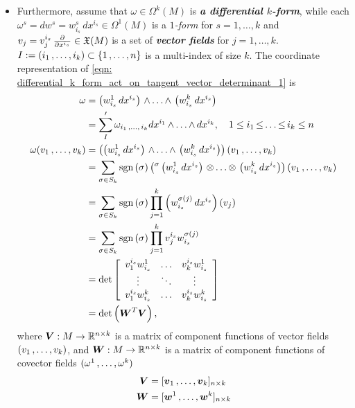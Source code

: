 \documentclass[11pt]{article}
\begin{document}
\begin{itemize}
\item Furthermore, assume that $\omega \in \Omega^k(M)$ is \emph{\textbf{a differential $k$-form}}, while each $\omega^{s} = dw^{s} = w_{i_s}^{s}\,dx^{i_s} \in \Omega^{1}(M)$ is a \emph{$1$-form} for $s=1,\ldots,k$ and $v_j = v_j^{i_s}\, \frac{\partial }{ \partial x^{i_s}} \in {\mathfrak X}(M)$ is a set of \emph{\textbf{vector fields}} for $j = 1,\ldots, k$. $I := (i_1 \,{,}\ldots{,}\, i_k) \subset \left\{1 \,{,}\ldots{,}\, n\right\}$ is a multi-index of size $k$. The coordinate representation of \eqref{eqn: differential_k_form_act_on_tangent_vector_determinant_1} is
\begin{align}
\omega &=\left(w_{i_s}^{1}\,dx^{i_s}\right) \,{\wedge}\ldots{\wedge}\, \left(w_{i_s}^{k}\,dx^{i_s}\right) \nonumber\\
&=\sum_{I}' \omega_{i_1 \,{,}\ldots{,}\, i_k}dx^{i_1} \,{\wedge}\ldots{\wedge}\, dx^{i_k} , \quad 1\le i_1 \,{\le}\ldots{\le}\, i_k \le n \nonumber\\
\omega(v_1 \,{,}\ldots{,}\, v_k)&= \left(\left(w_{i_s}^{1}\,dx^{i_s}\right) \,{\wedge}\ldots{\wedge}\, \left(w_{i_s}^{k}\,dx^{i_s}\right)\right)(v_1 \,{,}\ldots{,}\, v_k) \nonumber\\
&=\sum_{\sigma \in S_k}  \text{sgn}\left(\sigma\right)  \left( {^{\sigma}\left(w_{i_s}^{1}\,dx^{i_s}\right) \,{\otimes}\ldots{\otimes}\, \left(w_{i_s}^{k}\,dx^{i_s}\right)}\right)(v_1 \,{,}\ldots{,}\, v_k) \nonumber\\
&= \sum_{\sigma \in S_k}  \text{sgn}\left(\sigma\right)\prod_{j=1}^{k}\left(w_{i_s}^{\sigma(j)}\,dx^{i_s}\right)(v_j)\nonumber\\
&= \sum_{\sigma \in S_k} \text{sgn}\left(\sigma\right)  \prod_{j=1}^{k}v_j^{i_s}w_{i_s}^{\sigma(j)} \nonumber\\
&=  \det\left[\begin{array}{ccc}
v_1^{i_s}w_{i_s}^{1} & \ldots & v_k^{i_s}w_{i_s}^{1}  \\
\vdots & \ddots & \vdots \\
v_1^{i_s}w_{i_s}^{k}  & \ldots & v_k^{i_s}w_{i_s}^{k} 
\end{array}\right] \nonumber\\
&=  \det\left(\boldsymbol{W}^{T}\boldsymbol{V}\right),  \label{eqn: differential_k_form_act_on_tangent_vector_determinant_2}
\end{align} where $\boldsymbol{V}: M \rightarrow {\mathbb R}^{n \times k}$ is a matrix of  component functions of vector fields $(v_1 \,{,}\ldots{,}\, v_k)$, and $\boldsymbol{W}: M \rightarrow {\mathbb R}^{n \times k}$ is a matrix of component functions of covector fields $(\omega^1 \,{,}\ldots{,}\, \omega^k)$ 
\begin{align*}
\boldsymbol{V}  &= [\boldsymbol{v}_1 \,{,}\ldots{,}\, \boldsymbol{v}_k]_{n \times k} \\
\boldsymbol{W} &=  [\boldsymbol{w}^1 \,{,}\ldots{,}\, \boldsymbol{w}^k]_{n \times k}
\end{align*}


\end{itemize}
\end{document}
